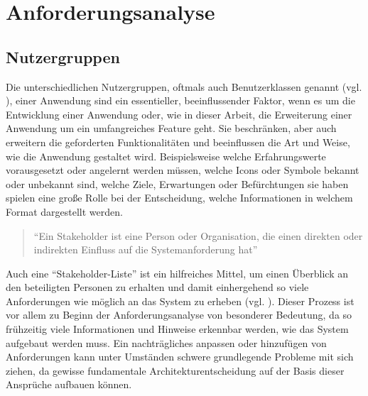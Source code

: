 \chapter{Anforderungsanalyse}
\label{anforderungsanalyse}
\minitoc\pagebreak
\section{Nutzergruppen}
Die unterschiedlichen Nutzergruppen, oftmals auch Benutzerklassen genannt (vgl. \cite[S. 125]{Herczeg.2018}), einer Anwendung sind ein essentieller, beeinflussender Faktor, wenn es um die Entwicklung einer Anwendung oder, wie in dieser Arbeit, die Erweiterung einer Anwendung um ein umfangreiches Feature geht. Sie beschränken, aber auch erweitern die geforderten Funktionalitäten und beeinflussen die Art und Weise, wie die Anwendung gestaltet wird. Beispielsweise welche Erfahrungswerte vorausgesetzt oder angelernt werden müssen, welche Icons oder Symbole bekannt oder unbekannt sind, welche Ziele, Erwartungen oder Befürchtungen sie haben spielen eine große Rolle bei der Entscheidung, welche Informationen in welchem Format dargestellt werden.

\begin{quote}
"`Ein Stakeholder ist eine Person oder Organisation, die einen direkten oder indirekten Einfluss auf die Systemanforderung hat"' \cite{Pohl.2011} 
\end{quote}
Auch eine "`Stakeholder-Liste"' ist ein hilfreiches Mittel, um einen Überblick an den beteiligten Personen zu erhalten und damit einhergehend so viele Anforderungen wie möglich an das System zu erheben (vgl. \cite[S. 83]{Bergsmann.2018}).
Dieser Prozess ist vor allem zu Beginn der Anforderungsanalyse von besonderer Bedeutung, da so frühzeitig viele Informationen und Hinweise erkennbar werden, wie das System aufgebaut werden muss.
Ein nachträgliches anpassen oder hinzufügen von Anforderungen kann unter Umständen schwere grundlegende Probleme mit sich ziehen, da gewisse fundamentale Architekturentscheidung auf der Basis dieser Ansprüche aufbauen können.

